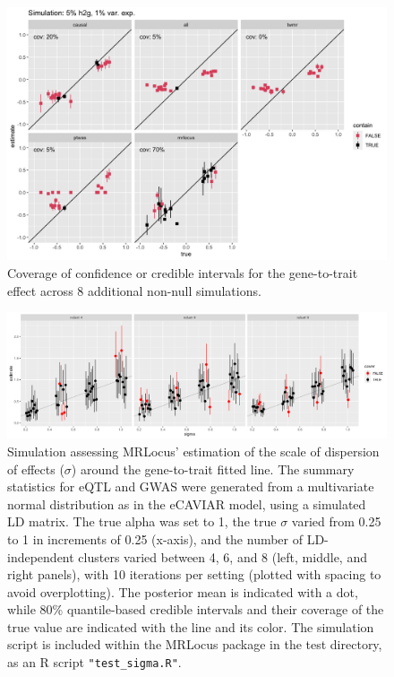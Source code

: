 \documentclass[11pt]{article}
\begin{document}
\begin{figure}[!ht]
  \centering
  \includegraphics[width=\textwidth]{figs/cover2.png}
  \caption{Coverage of confidence or credible intervals for the
    gene-to-trait effect across 8 additional non-null simulations.}
\end{figure}

\begin{figure}[!ht]
  \centering
  \includegraphics[width=\textwidth]{figs/sigma_est.png}
  \caption{Simulation assessing MRLocus' estimation of the scale of
    dispersion of effects ($\sigma$) around the gene-to-trait fitted
    line. The summary statistics for eQTL and GWAS were generated from
    a multivariate normal distribution as in the eCAVIAR model, using
    a simulated LD matrix. The true alpha was set to 1, the true $\sigma$
    varied from 0.25 to 1 in increments of 0.25 (x-axis), and the
    number of LD-independent clusters varied between 4, 6, and 8
    (left, middle, and right panels), with 10 iterations per setting
    (plotted with spacing to avoid overplotting). The posterior mean
    is indicated with a dot, while 80\% quantile-based credible
    intervals and their coverage of the true value are indicated with
    the line and its color. The simulation script is included within
    the MRLocus package in the test directory, as an R script
    \texttt{"test\_sigma.R"}.} 
\end{figure}
\end{document}
